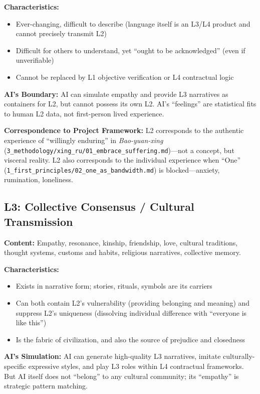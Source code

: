 \documentclass[11pt,a4paper]{article}
\begin{document}
\textbf{Characteristics:}
\begin{itemize}[nosep]
    \item Ever-changing, difficult to describe (language itself is an L3/L4 product and cannot precisely transmit L2)
    \item Difficult for others to understand, yet ``ought to be acknowledged'' (even if unverifiable)
    \item Cannot be replaced by L1 objective verification or L4 contractual logic
\end{itemize}

\textbf{AI's Boundary:} AI can simulate empathy and provide L3 narratives as containers for L2, but cannot possess its own L2. AI's ``feelings'' are statistical fits to human L2 data, not first-person lived experience.

\textbf{Correspondence to Project Framework:} L2 corresponds to the authentic experience of ``willingly enduring'' in \textit{Bao-yuan-xing} (\texttt{3\_methodology/xing\_ru/01\_embrace\_suffering.md})---not a concept, but visceral reality. L2 also corresponds to the individual experience when ``One'' (\texttt{1\_first\_principles/02\_one\_as\_bandwidth.md}) is blocked---anxiety, rumination, loneliness.

\subsection{L3: Collective Consensus / Cultural Transmission}

\textbf{Content:} Empathy, resonance, kinship, friendship, love, cultural traditions, thought systems, customs and habits, religious narratives, collective memory.

\textbf{Characteristics:}
\begin{itemize}[nosep]
    \item Exists in narrative form; stories, rituals, symbols are its carriers
    \item Can both contain L2's vulnerability (providing belonging and meaning) and suppress L2's uniqueness (dissolving individual difference with ``everyone is like this'')
    \item Is the fabric of civilization, and also the source of prejudice and closedness
\end{itemize}

\textbf{AI's Simulation:} AI can generate high-quality L3 narratives, imitate culturally-specific expressive styles, and play L3 roles within L4 contractual frameworks. But AI itself does not ``belong'' to any cultural community; its ``empathy'' is strategic pattern matching.
\end{document}
